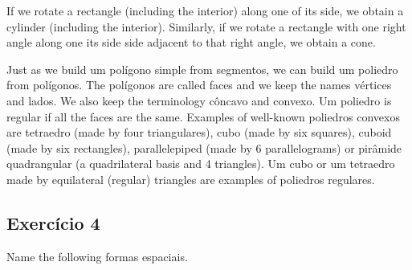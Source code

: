 If we rotate a rectangle (including the interior) along one of its side,
we obtain a cylinder (including the interior). Similarly, if we rotate
a rectangle with one right angle along one its side side adjacent to that
right angle, we obtain a cone.

Just as we build um polígono simple from segmentos, we can build um poliedro from
polígonos. The polígonos are called faces and we keep the names vértices and
lados. We also keep the terminology côncavo and convexo. Um poliedro is regular
if all the faces are the same. Examples of well-known poliedros convexos are
tetraedro (made by four triangulares), cubo (made by six squares),
cuboid (made by six rectangles), parallelepiped (made by 6 parallelograms) or
pirâmide quadrangular (a quadrilateral basis and 4 triangles).
Um cubo or um tetraedro
made by equilateral (regular) triangles are examples of poliedros regulares.

\subsection*{Exercício 4}

Name the following formas espaciais.

